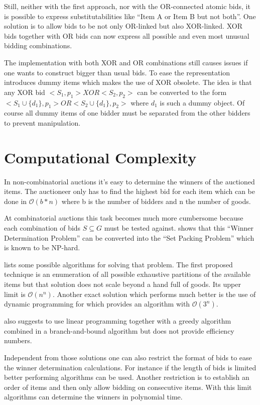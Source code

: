 \documentclass[a4paper]{paper}
\begin{document}
Still, neither with the first approach, nor with the OR-connected atomic bids, it is possible to express substitutabilities like ``Item A or Item B but not both''. One solution is to allow bids to be not only OR-linked but also XOR-linked. XOR bids together with OR bids can now express all possible and even most unusual bidding combinations.

The implementation with both XOR and OR combinations still causes issues if one wants to construct bigger than usual bids. To ease the representation \cite{FLBS99} introduces dummy items which makes the use of XOR obsolete. The idea is that any XOR bid $<S_1,p_1> XOR <S_2, p_2>$ can be converted to the form $<S_1 \cup \{d_1\}, p_1> OR <S_2 \cup \{d_1\}, p_2>$ where $d_1$ is such a dummy object. Of course all dummy items of one bidder must be separated from the other bidders to prevent manipulation.

\section{Computational Complexity}

In non-combinatorial auctions it's easy to determine the winners of the auctioned items. The auctioneer only has to find the highest bid for each item which can be done in $\mathcal O(b * n)$ where b is the number of bidders and n the number of goods.

At combinatorial auctions this task becomes much more cumbersome because each combination of bids $S \subseteq G$ must be tested against. \cite[pp.~46--47]{BCE12} shows that this ``Winner Determination Problem'' can be converted into the ``Set Packing Problem'' which is known to be NP-hard.

\cite[Chapter~2]{San02} lists some possible algorithms for solving that problem. The first proposed technique is an enumeration of all possible exhaustive partitions of the available items but that solution does not scale beyond a hand full of goods. Its upper limit is $\mathcal O(n^n)$. Another exact solution which performs much better is the use of dynamic programming for which \cite[Chapter~2.2]{San02} provides an algorithm with $\mathcal O(3^n)$.

\cite{Nis00} also suggests to use linear programming together with a greedy algorithm combined in a branch-and-bound algorithm but does not provide efficiency numbers.

Independent from those solutions one can also restrict the format of bids to ease the winner determination calculations. For instance if the length of bids is limited better performing algorithms can be used. Another restriction is to establish an order of items and then only allow bidding on consecutive items. With this limit algorithms can determine the winners in polynomial time.
\end{document}

